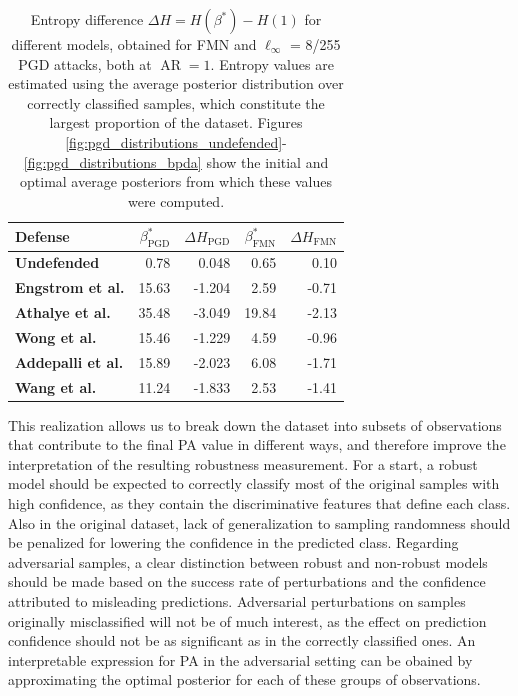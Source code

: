 \begin{table}[H]
    \centering
        \begin{tabular}{l|rr|rr}
        Defense & $\beta^{*}_{\text{PGD}}$ & $\Delta H_{\text{PGD}}$  & $\beta^{*}_{\text{FMN}}$ & $\Delta H_{\text{FMN}}$ \\
        \midrule
        {\color{tab:orange} \textbf{Undefended}} & 0.78 & 0.048 & 0.65 & 0.10\\
        {\color{tab:blue} \textbf{Engstrom et al.}} & 15.63 & -1.204 & 2.59 & -0.71\\
        {\color{tab:green} \textbf{Athalye et al.}} & 35.48 & -3.049 & 19.84 & -2.13 \\
        {\color{tab:red} \textbf{Wong et al.}} & 15.46 & -1.229 & 4.59 & -0.96\\
        {\color{tab:purple} \textbf{Addepalli et al.}} & 15.89 & -2.023 & 6.08 & -1.71 \\
        {\color{tab:brown} \textbf{Wang et al.}} & 11.24 & -1.833 & 2.53 & -1.41\\
        \bottomrule
        \end{tabular}
        \caption{
        Entropy difference $\Delta H = H(\beta^{*}) - H(1)$
        for different models, obtained for FMN and $\ell_\infty$ = 8/255 
        PGD attacks, both at $\operatorname{AR} = 1$. Entropy values are 
        estimated using the average posterior distribution over correctly classified
        samples, which constitute the largest proportion of the dataset.
        Figures \ref{fig:pgd_distributions_undefended}-\ref{fig:pgd_distributions_bpda}
        show the initial and optimal average posteriors from which these values
        were computed.
        }
        \label{tab:entropy_gibbs}
\end{table}

This realization allows us to break down the dataset into subsets of observations
that contribute to the final PA value in different ways, and therefore improve
the interpretation of the resulting robustness measurement.
For a start, a robust model should be expected to correctly classify most of the 
original samples with high confidence, as they
contain the discriminative features that define each class. Also in the original 
dataset, lack of generalization to sampling randomness should be penalized for lowering
the confidence in the predicted class. Regarding adversarial samples, a clear
distinction between robust and non-robust models should be made based on the success 
rate of perturbations and the confidence attributed to misleading predictions. Adversarial 
perturbations on samples originally misclassified will not be of much interest,
as the effect on prediction confidence should not be as significant as in
the correctly classified ones. An interpretable expression for PA in the adversarial
setting can be obained by approximating the optimal posterior for each of these
groups of observations. \\

